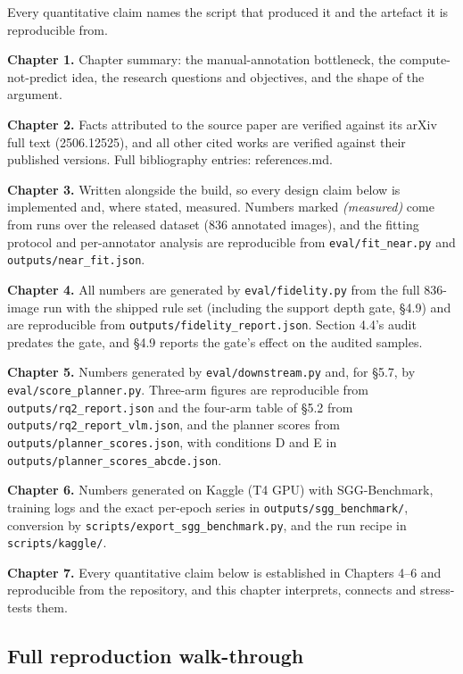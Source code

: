 Every quantitative claim names the script that produced it and the artefact it is reproducible from.

\textbf{Chapter 1.} Chapter summary: the manual-annotation bottleneck, the compute-not-predict idea, the research questions and objectives, and the shape of the argument.

\textbf{Chapter 2.} Facts attributed to the source paper are verified against its arXiv full text (2506.12525), and all other cited works are verified against their published versions. Full bibliography entries: references.md.

\textbf{Chapter 3.} Written alongside the build, so every design claim below is implemented and, where stated, measured. Numbers marked \textit{(measured)} come from runs over the released dataset (836 annotated images), and the fitting protocol and per-annotator analysis are reproducible from \texttt{eval/fit\_\allowbreak{}near.py} and \texttt{outputs/near\_\allowbreak{}fit.json}.

\textbf{Chapter 4.} All numbers are generated by \texttt{eval/fidelity.py} from the full 836-image run with the shipped rule set (including the support depth gate, \S{}4.9) and are reproducible from \texttt{outputs/fidelity\_\allowbreak{}report.json}. Section 4.4's audit predates the gate, and \S{}4.9 reports the gate's effect on the audited samples.

\textbf{Chapter 5.} Numbers generated by \texttt{eval/downstream.py} and, for \S{}5.7, by \texttt{eval/score\_\allowbreak{}planner.py}. Three-arm figures are reproducible from \texttt{outputs/rq2\_\allowbreak{}report.json} and the four-arm table of \S{}5.2 from \texttt{outputs/rq2\_\allowbreak{}report\_\allowbreak{}vlm.json}, and the planner scores from \texttt{outputs/planner\_\allowbreak{}scores.json}, with conditions D and E in \texttt{outputs/planner\_\allowbreak{}scores\_\allowbreak{}abcde.json}.

\textbf{Chapter 6.} Numbers generated on Kaggle (T4 GPU) with SGG-Benchmark, training logs and the exact per-epoch series in \texttt{outputs/sgg\_\allowbreak{}benchmark/}, conversion by \texttt{scripts/export\_\allowbreak{}sgg\_\allowbreak{}benchmark.py}, and the run recipe in \texttt{scripts/kaggle/}.

\textbf{Chapter 7.} Every quantitative claim below is established in Chapters 4--6 and reproducible from the repository, and this chapter interprets, connects and stress-tests them.

\subsection{Full reproduction walk-through}

